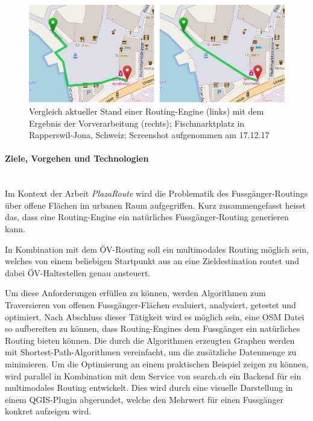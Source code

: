 \begin{figure}[ht]
    \centering
    \includegraphics[width=1\linewidth]{technicalreport/img/compare_fischmarktplatz.png}
    \caption[Vergleich Ausgangslage und Ergebnis]{Vergleich aktueller Stand einer Routing-Engine (links) mit dem Ergebnis der Vorverarbeitung (rechts); Fischmarktplatz in Rapperswil-Jona, Schweiz; Screenshot aufgenommen am 17.12.17}
    \label{fig:compare_fischmarktplatz}
\end{figure}


\paragraph{Ziele, Vorgehen und Technologien}~\\
Im Kontext der Arbeit \emph{PlazaRoute} wird die Problematik des Fussgänger-Routings über offene Flächen im urbanen Raum aufgegriffen. Kurz zusammengefasst heisst das, dass eine Routing-Engine ein natürliches Fussgänger-Routing generieren kann.

In Kombination mit dem ÖV-Routing soll ein multimodales Routing möglich sein, welches von einem beliebigen Startpunkt aus an eine Zieldestination routet und dabei ÖV-Haltestellen genau ansteuert.

Um diese Anforderungen erfüllen zu können, werden Algorithmen zum Traversieren von offenen Fussgänger-Flächen evaluiert, analysiert, getestet und optimiert. Nach Abschluss dieser Tätigkeit wird es möglich sein, eine \ac{OSM} Datei so aufbereiten zu können, dass Routing-Engines dem Fussgänger ein natürliches Routing bieten können. Die durch die Algorithmen erzeugten Graphen werden mit Shortest-Path-Algorithmen vereinfacht, um die zusätzliche Datenmenge zu minimieren.
Um die Optimierung an einem praktischen Beispiel zeigen zu können, wird parallel in Kombination mit dem Service von search.ch ein Backend für ein multimodales Routing entwickelt. Dies wird durch eine visuelle Darstellung in einem QGIS-Plugin abgerundet, welche den Mehrwert für einen Fussgänger konkret aufzeigen wird.

